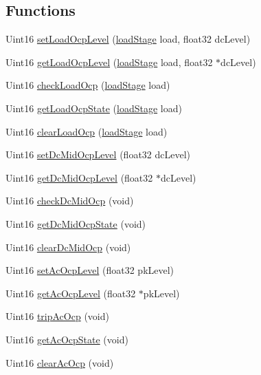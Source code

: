 \subsection*{Functions}
\begin{DoxyCompactItemize}
\item 
Uint16 \hyperlink{a00030_a5da4bbec3c1f5d83678a06f574cf664a}{set\-Load\-Ocp\-Level} (\hyperlink{a00027_a2820f1e18d921d2f1e97d53404b9fbae}{load\-Stage} load, float32 dc\-Level)
\item 
Uint16 \hyperlink{a00030_a3c056a05cc718b13f07af5e2421b2813}{get\-Load\-Ocp\-Level} (\hyperlink{a00027_a2820f1e18d921d2f1e97d53404b9fbae}{load\-Stage} load, float32 $\ast$dc\-Level)
\item 
Uint16 \hyperlink{a00030_a59c9eb4cd335a46e4c33651a26ecbf10}{check\-Load\-Ocp} (\hyperlink{a00027_a2820f1e18d921d2f1e97d53404b9fbae}{load\-Stage} load)
\item 
Uint16 \hyperlink{a00030_a89c27fb6ed80f4487598a23987aef528}{get\-Load\-Ocp\-State} (\hyperlink{a00027_a2820f1e18d921d2f1e97d53404b9fbae}{load\-Stage} load)
\item 
Uint16 \hyperlink{a00030_a21a8a91440da87204edb7e67d3fde578}{clear\-Load\-Ocp} (\hyperlink{a00027_a2820f1e18d921d2f1e97d53404b9fbae}{load\-Stage} load)
\item 
Uint16 \hyperlink{a00030_a2688d88502221ff2a5f79091a708408e}{set\-Dc\-Mid\-Ocp\-Level} (float32 dc\-Level)
\item 
Uint16 \hyperlink{a00030_ae7d51f03d13dea383fd543b1c8f19e49}{get\-Dc\-Mid\-Ocp\-Level} (float32 $\ast$dc\-Level)
\item 
Uint16 \hyperlink{a00030_acdbe7d23734fc6f4fbc3cc7ebe8ffb51}{check\-Dc\-Mid\-Ocp} (void)
\item 
Uint16 \hyperlink{a00030_a2144c56f3ede583b197273a88bd53801}{get\-Dc\-Mid\-Ocp\-State} (void)
\item 
Uint16 \hyperlink{a00030_a8f57a6183f616d09458d9cd3dfd84766}{clear\-Dc\-Mid\-Ocp} (void)
\item 
Uint16 \hyperlink{a00030_a4433a05d2924b2a5cc659ab8e8c8ff8a}{set\-Ac\-Ocp\-Level} (float32 pk\-Level)
\item 
Uint16 \hyperlink{a00030_a7273f23cc84891cc7cda8d3081c6b946}{get\-Ac\-Ocp\-Level} (float32 $\ast$pk\-Level)
\item 
Uint16 \hyperlink{a00030_aecbc5bcbe9cc0babef4d0c742ac82170}{trip\-Ac\-Ocp} (void)
\item 
Uint16 \hyperlink{a00030_ad496df3ce8212c5a991e62c8a44ff060}{get\-Ac\-Ocp\-State} (void)
\item 
Uint16 \hyperlink{a00030_ad2757e72816f7a5c6a6a70760e9012a8}{clear\-Ac\-Ocp} (void)
\end{DoxyCompactItemize}


